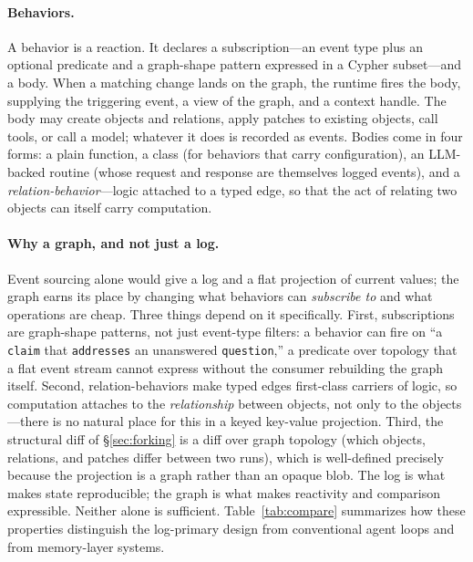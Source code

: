 \documentclass[11pt]{article}
\begin{document}
\paragraph{Behaviors.}
A behavior is a reaction. It declares a subscription---an event type plus an
optional predicate and a graph-shape pattern expressed in a Cypher
subset---and a body. When a matching change lands on the graph, the runtime fires
the body, supplying the triggering event, a view of the graph, and a context
handle. The body may create objects and relations, apply patches to existing
objects, call tools, or call a model; whatever it does is recorded as events.
Bodies come in four forms: a plain function, a class (for behaviors that carry
configuration), an LLM-backed routine (whose request and response are themselves
logged events), and a \emph{relation-behavior}---logic attached to a typed edge,
so that the act of relating two objects can itself carry computation.

\paragraph{Why a graph, and not just a log.}
Event sourcing alone would give a log and a flat projection of current values; the
graph earns its place by changing what behaviors can \emph{subscribe to} and what
operations are cheap. Three things depend on it specifically. First, subscriptions
are graph-shape patterns, not just event-type filters: a behavior can fire on
``a \texttt{claim} that \texttt{addresses} an unanswered \texttt{question},'' a
predicate over topology that a flat event stream cannot express without the
consumer rebuilding the graph itself. Second, relation-behaviors make typed edges
first-class carriers of logic, so computation attaches to the \emph{relationship}
between objects, not only to the objects---there is no natural place for this in a
keyed key-value projection. Third, the structural diff of \S\ref{sec:forking} is a
diff over graph topology (which objects, relations, and patches differ between two
runs), which is well-defined precisely because the projection is a graph rather
than an opaque blob. The log is what makes state reproducible; the graph is what
makes reactivity and comparison expressible. Neither alone is sufficient.
Table~\ref{tab:compare} summarizes how these properties distinguish the
log-primary design from conventional agent loops and from memory-layer systems.
\end{document}
